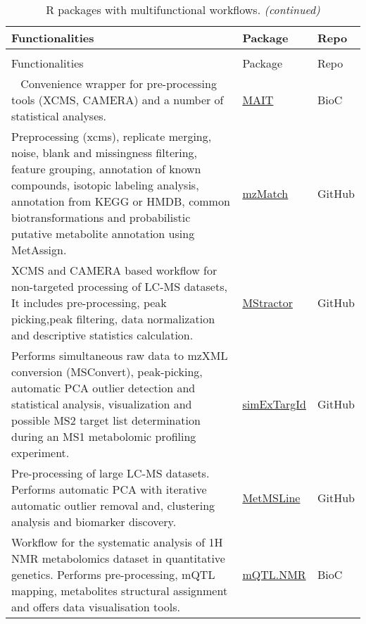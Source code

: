 \documentclass[]{article}
\begin{document}
\begin{longtable}[t]{>{\raggedright\arraybackslash}p{30em}>{\raggedright\arraybackslash}p{10em}>{\raggedright\arraybackslash}p{3em}}
\caption{\label{tab:tab9}R packages with multifunctional workflows.}\\
\toprule
Functionalities & Package & Repo\\
\midrule
\endfirsthead
\caption[]{\label{tab:tab9}R packages with multifunctional workflows. \textit{(continued)}}\\
\toprule
Functionalities & Package & Repo\\
\midrule
\endhead
\
\endfoot
\bottomrule
\endlastfoot
\rowcolor{gray!6}  Convenience wrapper for pre-processing tools (XCMS, CAMERA) and a number of statistical analyses. & \href{https://www.bioconductor.org/packages/release/bioc/html/MAIT.html}{MAIT} & BioC\\
Preprocessing (xcms), replicate merging, noise, blank and missingness filtering, feature grouping, annotation of known compounds, isotopic labeling analysis, annotation from KEGG or HMDB, common biotransformations and probabilistic putative metabolite annotation using MetAssign. & \href{https://github.com/andzajan/mzmatch.R}{mzMatch} & GitHub\\
\rowcolor{gray!6}  XCMS and CAMERA based workflow for non-targeted processing of LC-MS datasets, It includes pre-processing, peak picking,peak filtering, data normalization and descriptive statistics calculation. & \href{https://github.com/search?q=MStractor}{MStractor} & GitHub\\
Performs simultaneous raw data to mzXML conversion (MSConvert), peak-picking, automatic PCA outlier detection and statistical analysis, visualization and possible MS2 target list determination during an MS1 metabolomic profiling experiment. & \href{https://github.com/WMBEdmands/simExTargId}{simExTargId} & GitHub\\
\rowcolor{gray!6}  Pre-processing of large LC-MS datasets. Performs automatic PCA with iterative automatic outlier removal and, clustering analysis and biomarker discovery. & \href{https://github.com/WMBEdmands/MetMSLine}{MetMSLine} & GitHub\\
\addlinespace
Workflow for the systematic analysis of 1H NMR metabolomics dataset in quantitative genetics. Performs pre-processing, mQTL mapping, metabolites structural assignment and offers data visualisation tools. & \href{https://www.bioconductor.org/packages/3.5/bioc/html/mQTL.NMR.html}{mQTL.NMR} & BioC\\

\end{longtable}
\end{document}
